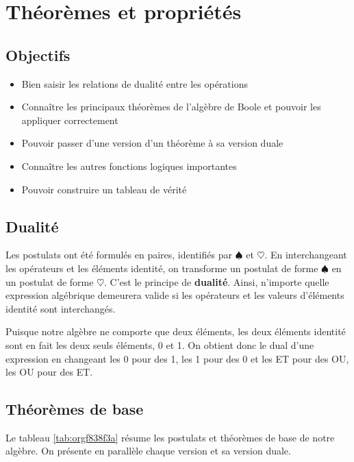 \documentclass[11pt]{article}
\begin{document}
\section{Théorèmes et propriétés}
\label{sec:orgd1c25d4}
\subsection{Objectifs}
\label{sec:org20decc2}
\begin{itemize}
\item Bien saisir les relations de dualité entre les opérations
\item Connaître les principaux théorèmes de l'algèbre de Boole et pouvoir
les appliquer correctement
\item Pouvoir passer d'une version d'un théorème à sa version duale
\item Connaître les autres fonctions logiques importantes
\item Pouvoir construire un tableau de vérité
\end{itemize}

\subsection{Dualité}
\label{sec:org18c7279}

Les postulats ont été formulés en paires, identifiés par \(\spadesuit\) et
\(\heartsuit\). En interchangeant les opérateurs et les éléments identité, on
transforme un postulat de forme \(\spadesuit\) en un postulat de forme
\(\heartsuit\). C'est le principe de \textbf{dualité}. Ainsi, n'importe quelle
expression algébrique demeurera valide si les opérateurs et les
valeurs d'éléments identité sont interchangés.

Puisque notre algèbre ne comporte que deux éléments, les deux éléments
identité sont en fait les deux seuls éléments, 0 et 1. On obtient donc
le dual d'une expression en changeant les 0 pour des 1, les 1 pour des
0 et les ET pour des OU, les OU pour des ET.

\subsection{Théorèmes de base}
\label{sec:org57d9f1e}

Le tableau \ref{tab:orgf838f3a} résume les postulats et théorèmes de base de
notre algèbre. On présente en parallèle chaque version et sa version
duale.
\end{document}
